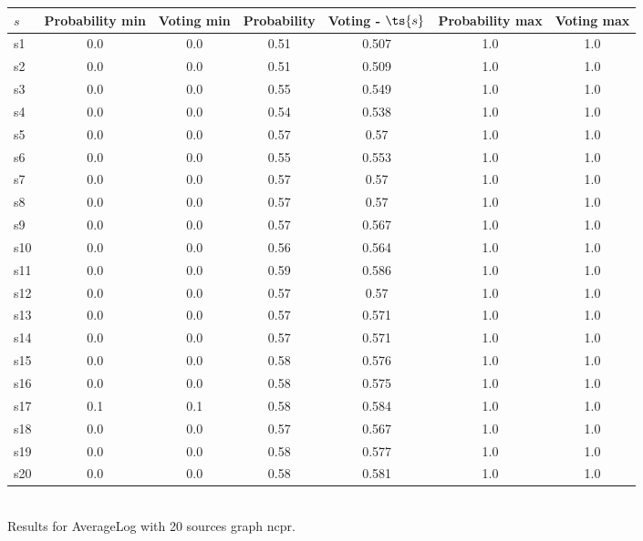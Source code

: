 \documentclass{article}
\begin{document}
\noindent\begin{tabular}{|l|c|c|c|c|c|c|}
\hline
$s$& Probability min & Voting min & Probability & Voting - $\ts{s}$ & Probability max & Voting max\\
\hline
s1 &0.0 & 0.0 & 0.51 & 0.507 & 1.0 & 1.0\\
\hline
s2 &0.0 & 0.0 & 0.51 & 0.509 & 1.0 & 1.0\\
\hline
s3 &0.0 & 0.0 & 0.55 & 0.549 & 1.0 & 1.0\\
\hline
s4 &0.0 & 0.0 & 0.54 & 0.538 & 1.0 & 1.0\\
\hline
s5 &0.0 & 0.0 & 0.57 & 0.57 & 1.0 & 1.0\\
\hline
s6 &0.0 & 0.0 & 0.55 & 0.553 & 1.0 & 1.0\\
\hline
s7 &0.0 & 0.0 & 0.57 & 0.57 & 1.0 & 1.0\\
\hline
s8 &0.0 & 0.0 & 0.57 & 0.57 & 1.0 & 1.0\\
\hline
s9 &0.0 & 0.0 & 0.57 & 0.567 & 1.0 & 1.0\\
\hline
s10 &0.0 & 0.0 & 0.56 & 0.564 & 1.0 & 1.0\\
\hline
s11 &0.0 & 0.0 & 0.59 & 0.586 & 1.0 & 1.0\\
\hline
s12 &0.0 & 0.0 & 0.57 & 0.57 & 1.0 & 1.0\\
\hline
s13 &0.0 & 0.0 & 0.57 & 0.571 & 1.0 & 1.0\\
\hline
s14 &0.0 & 0.0 & 0.57 & 0.571 & 1.0 & 1.0\\
\hline
s15 &0.0 & 0.0 & 0.58 & 0.576 & 1.0 & 1.0\\
\hline
s16 &0.0 & 0.0 & 0.58 & 0.575 & 1.0 & 1.0\\
\hline
s17 &0.1 & 0.1 & 0.58 & 0.584 & 1.0 & 1.0\\
\hline
s18 &0.0 & 0.0 & 0.57 & 0.567 & 1.0 & 1.0\\
\hline
s19 &0.0 & 0.0 & 0.58 & 0.577 & 1.0 & 1.0\\
\hline
s20 &0.0 & 0.0 & 0.58 & 0.581 & 1.0 & 1.0\\
\hline
\end{tabular}\\

\noindent Results for AverageLog with 20 sources graph ncpr.
\end{document}
